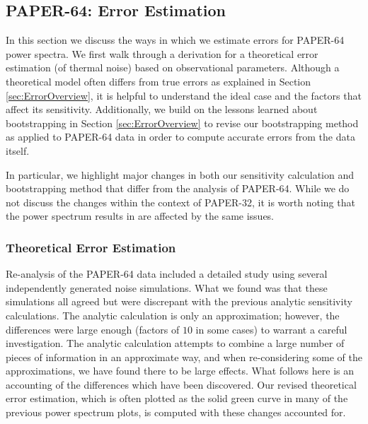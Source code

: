 \documentclass[preprint2,numberedappendix,tighten]{aastex6}  %
\begin{document}

\subsection{PAPER-64: Error Estimation}
\label{sec:Error}

In this section we discuss the ways in which we estimate errors for PAPER-64 power spectra. We first walk through a derivation 
for a theoretical error estimation (of thermal noise) based on observational parameters. Although a theoretical model often 
differs from true errors as explained in Section \ref{sec:ErrorOverview}, it is helpful to understand the ideal case and the factors 
that affect its sensitivity. Additionally, we build on the lessons learned about bootstrapping in Section \ref{sec:ErrorOverview} to 
revise our bootstrapping method as applied to PAPER-64 data in order to compute accurate errors from the data itself.

In particular, we highlight major changes in both our sensitivity calculation and bootstrapping method that differ from the  
analysis of PAPER-64. While we do not discuss the changes within the context of PAPER-32, it is worth noting that the power 
spectrum results in \citet{parsons_et_al2014} are affected by the same issues.

\subsubsection{Theoretical Error Estimation}
\label{sec:PSSense}

Re-analysis of the PAPER-64 data included a detailed study using several independently generated noise simulations. What we 
found was that these simulations all agreed but were discrepant with the previous analytic sensitivity calculations. The analytic 
calculation is only an approximation; however, the differences were large enough (factors of $10$ in some cases) to warrant a 
careful investigation. The analytic calculation attempts to combine a large number of pieces of information in an approximate 
way, and when re-considering some of the approximations, we have found there to be large effects. What follows here is an 
accounting of the differences which have been discovered. Our revised theoretical error estimation, which is often plotted as the solid green curve in many of the previous power spectrum plots, is computed with these changes accounted for.
\end{document}
